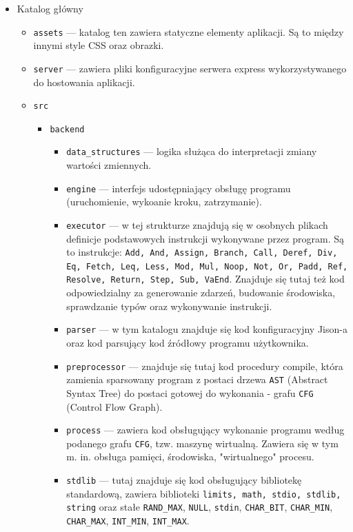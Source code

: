 \documentclass[a4paper,twoside,openright,11pt]{report}
\begin{document}
  \begin {itemize}
    \item Katalog główny
    \begin {itemize}
      \item \texttt{assets} --- katalog ten zawiera statyczne elementy aplikacji. Są to między innymi style CSS oraz obrazki.
      \item \texttt{server} --- zawiera pliki konfiguracyjne serwera express wykorzystywanego do hostowania aplikacji.
      \item \texttt{src}
      \begin {itemize}
        \item \texttt{backend}
	\begin {itemize}
	  \item \texttt{data\_structures} --- logika służąca do interpretacji zmiany wartości zmiennych.
	  \item \texttt{engine} --- interfejs udostępniający obsługę programu (uruchomienie, wykoanie kroku, zatrzymanie).
	  \item \texttt{executor} --- w tej strukturze znajdują się w osobnych plikach definicje podstawowych instrukcji wykonywane przez program. Są to instrukcje: \texttt{Add, And, Assign, Branch, Call, Deref, Div, Eq, Fetch, Leq, Less, Mod, Mul, Noop, Not, Or, Padd, Ref, Resolve, Return, Step, Sub, VaEnd}. Znajduje się tutaj też kod odpowiedzialny za generowanie zdarzeń, budowanie środowiska, sprawdzanie typów oraz wykonywanie instrukcji.
	  \item \texttt{parser} --- w tym katalogu znajduje się kod konfiguracyjny Jison-a oraz kod parsujący kod źródłowy programu użytkownika.
	  \item \texttt{preprocessor} --- znajduje się tutaj kod procedury compile, która zamienia sparsowany program z postaci drzewa \texttt{AST} (Abstract Syntax Tree) do postaci gotowej do wykonania - grafu \texttt{CFG} (Control Flow Graph).
	  \item \texttt{process} --- zawiera kod obsługujący wykonanie programu według podanego grafu \texttt{CFG}, tzw. maszynę wirtualną. Zawiera się w tym m. in. obsługa pamięci, środowiska, "wirtualnego" procesu.
	  \item \texttt{stdlib} --- tutaj znajduje się kod obsługujący bibliotekę standardową, zawiera biblioteki \texttt{limits, math, stdio, stdlib, string} oraz stałe \texttt{RAND\_MAX}, \texttt{NULL}, \texttt{stdin}, \texttt{CHAR\_BIT}, \texttt{CHAR\_MIN}, \texttt{CHAR\_MAX}, \texttt{INT\_MIN}, \texttt{INT\_MAX}.
	\end {itemize} 

\end{itemize}
\end{itemize}
\end{itemize}
\end{document}
